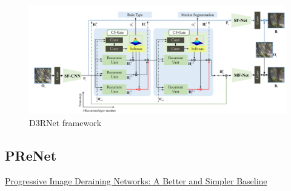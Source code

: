 \documentclass{article}
\begin{document}
\begin{figure}[H]
\centering
\includegraphics[width=\linewidth]{D3RNET2}
\caption{D3RNet framework}
\end{figure}
\subsection{PReNet}
\href{https://csdwren.github.io/papers/PReNet_cvpr_camera.pdf}{Progressive Image Deraining Networks: A Better and Simpler Baseline}
\end{document}
